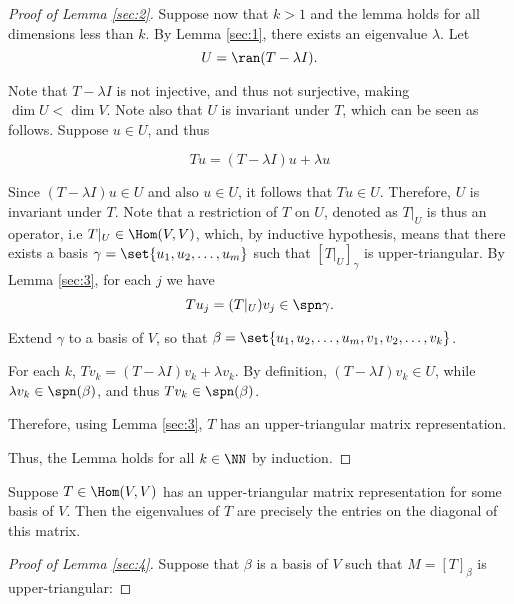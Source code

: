 \documentclass[11pt]{scrartcl}
\begin{document}
\begin{linenumbers}
\begin{proof}[Proof of Lemma \ref{sec:2}]
    Suppose now that $k> 1$ and the lemma holds for all dimensions
    less than $k$. By Lemma \ref{sec:1}, there exists an eigenvalue
    $\lambda$. Let
    \begin{equation*}
      U=\ran(T-\lambda I).
    \end{equation*}

    Note that $T-\lambda I$ is not injective, and thus not surjective,
    making $\dim U < \dim V$. Note also that $U$ is invariant under
    $T$, which can be seen as follows. Suppose $u\in U$, and thus

    \begin{equation*}
      Tu = (T-\lambda I) u + \lambda u
    \end{equation*}

    Since $(T-\lambda I) u \in U$ and also $u\in U$, it follows that
    $T u \in U$. Therefore, $U$ is invariant under $T$. Note that a
    restriction of $T$ on $U$, denoted as $T|_{U}$ is thus an
    operator, i.e $T|_{U} \in \Hom(V,V)$, which, by inductive
    hypothesis, means that there exists a basis
    $\gamma = \set{u_1, u_2, \dots, u_m}$ such that
    $[T|_{U}]_{\gamma}$ is upper-triangular. By Lemma \ref{sec:3}, for
    each $j$ we have
    \begin{equation*}
      Tu_j= (T|_{U})v_j \in \spn \gamma.
    \end{equation*}


    Extend $\gamma$ to a
    basis of $V$, so that
    $\beta = \set{u_1, u_2, \dots, u_m, v_1, v_2, \dots, v_k}$.

    For each $k$, $Tv_k = (T-\lambda I)v_k + \lambda v_{k}$. By
    definition, $ (T-\lambda I)v_k \in U$, while
    $\lambda v_{k} \in \spn(\beta)$, and thus $Tv_k\in \spn(\beta)$.

    Therefore, using Lemma \ref{sec:3}, $T$ has an upper-triangular
    matrix representation.

    Thus, the Lemma holds for all $k\in \NN$ by induction.
  \end{proof}

  \begin{lemma}
    \label{sec:4}
    Suppose $T\in\Hom(V,V)$ has an upper-triangular matrix
    representation for some basis of $V$. Then the eigenvalues of $T$
    are precisely the entries on the diagonal of this matrix.
  \end{lemma}
  \begin{proof}[Proof of Lemma \ref{sec:4}]
    Suppose that $\beta$ is a basis of $V$ such that $M = [T]_{\beta}$
    is upper-triangular:


\end{proof}
\end{linenumbers}
\end{document}
